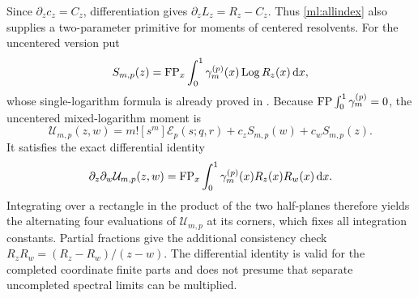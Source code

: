 Since $\partial_zc_z=C_z$, differentiation gives
$\partial_zL_z=R_z-C_z$. Thus \eqref{ml:allindex} also supplies a
two-parameter primitive for moments of centered resolvents. For the
uncentered version put
\[
 S_{m,p}(z)=\operatorname{FP}_x\int_0^1\gamma_m^{(p)}(x)\operatorname{Log} R_z(x)\,\mathrm d x,
\]
whose single-logarithm formula is already proved in
\cite[complex-power section]{repo:quartic}. Because
$\operatorname{FP}\int_0^1\gamma_m^{(p)}=0$, the uncentered mixed-logarithm moment is
\begin{equation}\label{ml:uncentered}
 \mathcal U_{m,p}(z,w)=m![s^m]\mathcal E_p(s;q,r)
                                      +c_zS_{m,p}(w)+c_wS_{m,p}(z).
\end{equation}
It satisfies the exact differential identity
\begin{equation}\label{ml:doubleprimitive}
 \partial_z\partial_w\mathcal U_{m,p}(z,w)
       =\operatorname{FP}_x\int_0^1\gamma_m^{(p)}(x)R_z(x)R_w(x)\,\mathrm d x.
\end{equation}
Integrating over a rectangle in the product of the two half-planes
therefore yields the alternating four evaluations of
$\mathcal U_{m,p}$ at its corners, which fixes all integration constants.
Partial fractions give the additional consistency check
$R_zR_w=(R_z-R_w)/(z-w)$. The differential identity is valid for
the completed coordinate finite parts and does not presume that separate
uncompleted spectral limits can be multiplied.
